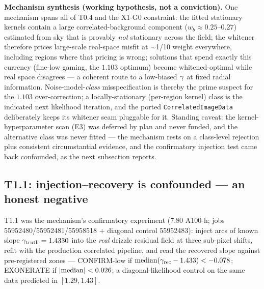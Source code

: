 \medskip\noindent\textbf{Mechanism synthesis (working hypothesis, not a
conviction).} One mechanism spans all of T0.4 and the X1-G0 constraint: the
fitted stationary kernels contain a large correlated-background component
($w_b\approx0.25$--$0.27$) estimated from sky that is provably \emph{not}
stationary across the field; the whitener therefore prices large-scale
real-space misfit at $\sim$1/10 weight everywhere, including regions where
that pricing is wrong; solutions that spend exactly this currency
(fine-low gaming, the $1.103$ optimum) become whitened-optimal while real
space disagrees --- a coherent route to a low-biased $\gamma$ at fixed
radial information. Noise-model-\emph{class} misspecification is thereby the
prime suspect for the $1.103$ over-correction; a locally-stationary
(per-region kernel) class is the indicated next likelihood iteration, and
the ported \texttt{CorrelatedImageData} deliberately keeps its whitener seam
pluggable for it. Standing caveat: the kernel-hyperparameter scan (E3) was
deferred by plan and never funded, and the alternative class was never
fitted --- the mechanism rests on a class-level rejection plus consistent
circumstantial evidence, and the confirmatory injection test came back
confounded, as the next subsection reports.

\subsection{T1.1: injection--recovery is confounded --- an honest negative}
\label{sec:t11}

T1.1 was the mechanism's confirmatory experiment (7.80 A100-h; jobs
55952480/55952481/55958518 + diagonal control 55952483): inject arcs of
known slope $\gamma_{\rm truth}=1.4330$ into the \emph{real} 
drizzle residual field at three sub-pixel shifts, refit with the production
correlated pipeline, and read the recovered slope against pre-registered
zones --- CONFIRM-low if ${\rm median}(\gamma_{\rm rec}-1.433)<-0.078$;
EXONERATE if $|{\rm median}|<0.026$; a diagonal-likelihood control on the
same data predicted in
$[1.29,1.43]$.

